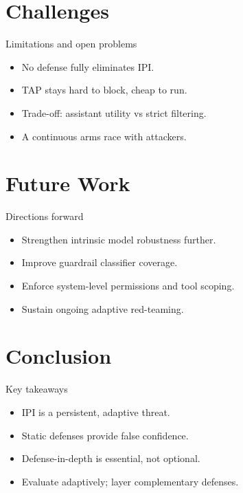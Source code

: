 \documentclass{beamer}
\begin{document}
\section{Challenges}
\begin{frame}{Limitations and open problems}
\begin{itemize}
\item No defense fully eliminates IPI.
\item TAP stays hard to block, cheap to run.
\item Trade-off: assistant utility vs strict filtering.
\item A continuous arms race with attackers.
\end{itemize}
\end{frame}

\section{Future Work}
\begin{frame}{Directions forward}
\begin{itemize}
\item Strengthen intrinsic model robustness further.
\item Improve guardrail classifier coverage.
\item Enforce system-level permissions and tool scoping.
\item Sustain ongoing adaptive red-teaming.
\end{itemize}
\end{frame}

\section{Conclusion}
\begin{frame}{Key takeaways}
\begin{itemize}
\item IPI is a persistent, adaptive threat.
\item Static defenses provide false confidence.
\item Defense-in-depth is essential, not optional.
\item Evaluate adaptively; layer complementary defenses.
\end{itemize}
\end{frame}
\end{document}
